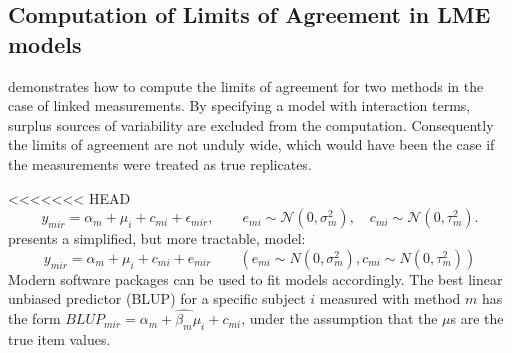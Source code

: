 \documentclass[12pt, a4paper]{report}
\theoremstyle{plain}
\theoremstyle{definition}
\theoremstyle{remark}
\begin{document}
\subsection{Computation of Limits of Agreement in LME models}


\citet{BXC2008} demonstrates how to compute the limits of agreement for two methods in the case of linked measurements. By specifying a model with interaction terms, surplus sources of variability are excluded from the computation. Consequently the limits of agreement are not unduly wide, which would have been the case if the measurements were treated as true replicates.

<<<<<<< HEAD
\begin{equation}
y_{mir}  = \alpha_{m} + \mu_{i} + c_{mi} + \epsilon_{mir}, \qquad  e_{mi}
\sim \mathcal{N}(0,\sigma^{2}_{m}), \quad c_{mi} \sim \mathcal{N}(0,\tau^{2}_{m}).
\end{equation}		
	\citet{BXC2008} presents a simplified, but more tractable, model:
	\begin{equation}
		y_{mir}  = \alpha_{m} + \mu_{i} + c_{mi} + e_{mir} \qquad ( e_{mi}
		\sim N(0,\sigma^{2}_{m}), c_{mi} \sim N(0,\tau^{2}_{m}))
	\label{BXC-simple}
	\end{equation}
	Modern software packages can be used to fit models accordingly. The best linear unbiased predictor (BLUP) for a specific subject $i$ measured with method $m$ has the form $BLUP_{mir} = \hat{\alpha_{m}} +
	\hat{\beta_{m}}\mu_{i} + c_{mi}$, under the assumption that the
	$\mu$s are the true item values.
	
	
	
	
	
\end{document}
